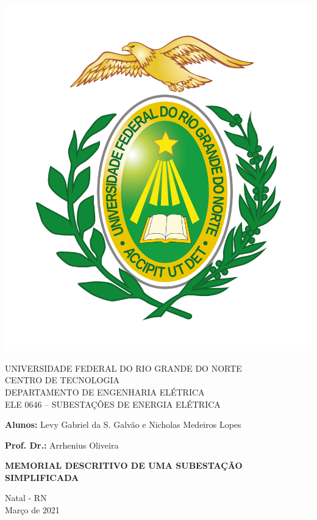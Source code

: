 \documentclass[12pt, a4paper, oneside]{article}
\begin{document}





\thispagestyle{empty}

\begin{center}
\begin{center}
    \includegraphics[width=0.2\linewidth]{brasao_gradiente.png}
\end{center}


\begin{center}
    UNIVERSIDADE FEDERAL DO RIO GRANDE DO NORTE \\
    CENTRO DE TECNOLOGIA \\
    DEPARTAMENTO DE ENGENHARIA ELÉTRICA \\
    ELE 0646 – SUBESTAÇÕES DE ENERGIA ELÉTRICA \\
\end{center}

\vspace{2cm}


\begin{center}
    \large \textbf{Alunos:} Levy Gabriel da S. Galvão e Nicholas Medeiros Lopes
    
    
    \large \textbf{Prof. Dr.:} Arrhenius Oliveira
\end{center}

\vspace{4cm}


\textbf{\Large{MEMORIAL DESCRITIVO DE UMA SUBESTAÇÃO SIMPLIFICADA}}\\

\vspace{5cm}



\large Natal - RN \\
Março de 2021
\end{center}








\thispagestyle{empty}
\newpage

\tableofcontents
\setcounter{page}{1}

\newpage


\end{document}
